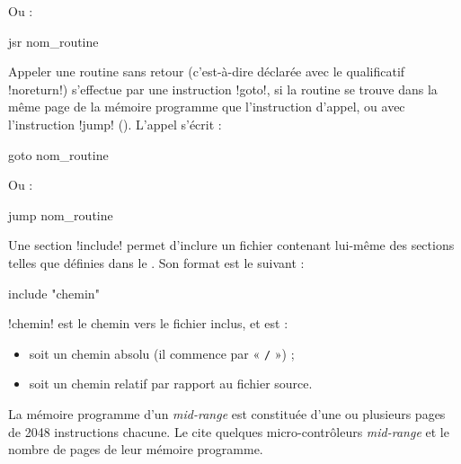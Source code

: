 Ou :

\begin{piccolo}
jsr nom_routine
\end{piccolo}





Appeler une routine sans retour (c'est-à-dire déclarée avec le qualificatif \pic!noreturn!) s'effectue par une instruction \pic!goto!, si la routine se trouve dans la même page de la mémoire programme que l'instruction d'appel, ou avec l'instruction \pic!jump! (). L'appel s'écrit :
\begin{piccolo}
goto nom_routine
\end{piccolo}

Ou :

\begin{piccolo}
jump nom_routine
\end{piccolo}





Une section \pic!include! permet d'inclure un fichier contenant lui-même des sections telles que définies dans le .  Son format est le suivant :

\begin{piccolo}
  include "chemin"
\end{piccolo}

\pic!chemin! est le chemin vers le fichier inclus, et est :
\begin{itemize}
  \item soit un chemin absolu (il commence par « \texttt{/} ») ;
  \item soit un chemin relatif par rapport au fichier source.
\end{itemize}


La mémoire programme d'un \emph{mid-range} est constituée d'une ou plusieurs pages de 2048 instructions chacune. Le  cite quelques micro-contrôleurs \emph{mid-range} et le nombre de pages de leur mémoire programme.

